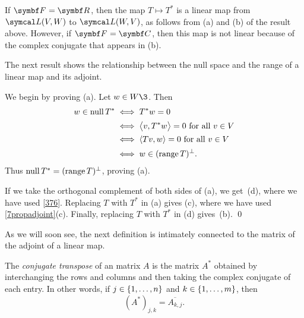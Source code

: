 If $\F{} = \R{}$, then the map $T \mapsto T^*$ is a linear map from $\L(V, W)$ to $\L(W,V)$, as follows from (a) and (b) of the result above. However, if $\F{} = \C{}$, then this map is not linear because of the complex conjugate that appears in (b).

\pagebreak[3]

The next result shows the relationship between the null space and the range of a linear map and its adjoint.


\proof
We begin by proving (a).  Let $w \in W\3$.  Then
\begin{align*}
w \in \ker T^* &\iff T^*w = 0 \\[1bp]
&\iff \ip[\big]{v, T^*w} = 0  \text{\ for all\ } v \in V\\[1bp]
&\iff \ip{Tv, w} = 0  \text{\ for all\ } v \in V\\[1bp]
&\iff w \in (\ran T)^\perp.
\end{align*}
Thus $\ker T^* = (\ran T)^\perp$, proving (a).

If we take the orthogonal complement of both sides of (a), we get~(d),
where we have used \ref{376}.  Replacing $T$ with $T^*$ in (a) gives (c), where we have used \ref{7propadjoint}(c). Finally, replacing $T$ with $T^*$ in (d)
gives~(b).
\qed

As we will soon see, the next definition is intimately connected to the matrix of the adjoint of a linear map.

{The \emph{conjugate transpose} of an  matrix $A$ is the  matrix $A^*$ obtained by interchanging the rows and columns and then taking the complex
conjugate of each entry. In other words, if $j \in \br{1, \ldots, n}$ and $k \in \br{1, \ldots, m}$, then
\[
(A^*)_{j,k} = \overline{A_{k,j}}.
\]}

